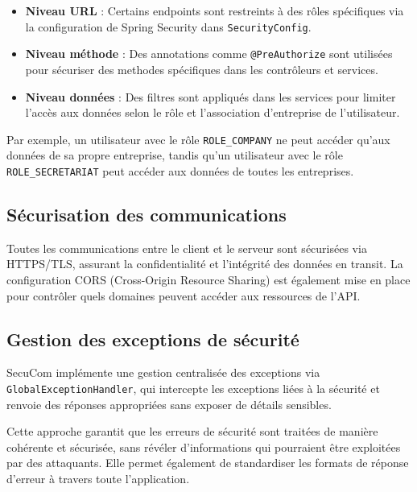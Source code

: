 \begin{itemize}[leftmargin=*,label=\textcolor{darkgray}{$\bullet$},itemsep=0.3em]
  \item \textbf{Niveau URL} : Certains endpoints sont restreints à des rôles spécifiques via la configuration de Spring Security dans \texttt{SecurityConfig}.
  \item \textbf{Niveau méthode} : Des annotations comme \texttt{@PreAuthorize} sont utilisées pour sécuriser des methodes spécifiques dans les contrôleurs et services.
  \item \textbf{Niveau données} : Des filtres sont appliqués dans les services pour limiter l'accès aux données selon le rôle et l'association d'entreprise de l'utilisateur.
\end{itemize}

\vspace{0.5cm}

\begin{note}
Par exemple, un utilisateur avec le rôle \texttt{ROLE\_COMPANY} ne peut accéder qu'aux données de sa propre entreprise, tandis qu'un utilisateur avec le rôle \texttt{ROLE\_SECRETARIAT} peut accéder aux données de toutes les entreprises.
\end{note}

\subsection{Sécurisation des communications}

Toutes les communications entre le client et le serveur sont sécurisées via HTTPS/TLS, assurant la confidentialité et l'intégrité des données en transit. La configuration CORS (Cross-Origin Resource Sharing) est également mise en place pour contrôler quels domaines peuvent accéder aux ressources de l'API.

\subsection{Gestion des exceptions de sécurité}

SecuCom implémente une gestion centralisée des exceptions via \texttt{GlobalExceptionHandler}, qui intercepte les exceptions liées à la sécurité et renvoie des réponses appropriées sans exposer de détails sensibles.

\vspace{0.5cm}

\begin{tcolorbox}[
  title={\textbf{Avantages de la gestion centralisée des exceptions}},
  colback=blue!5!white,
  colframe=primarycolor,
  fonttitle=\bfseries,
  boxrule=0.5mm,
  arc=2mm,
  left=6mm,
  right=6mm,
  top=6mm,
  bottom=6mm
]
Cette approche garantit que les erreurs de sécurité sont traitées de manière cohérente et sécurisée, sans révéler d'informations qui pourraient être exploitées par des attaquants. Elle permet également de standardiser les formats de réponse d'erreur à travers toute l'application.
\end{tcolorbox}

